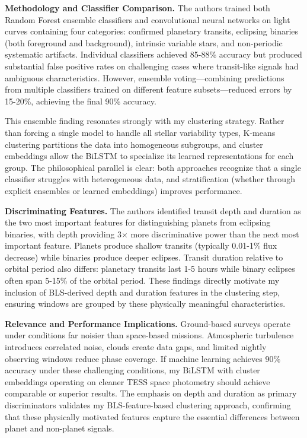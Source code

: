 \documentclass[letterpaper]{article} %
\begin{document}
\textbf{Methodology and Classifier Comparison.} The authors trained both Random Forest ensemble classifiers and convolutional neural networks on light curves containing four categories: confirmed planetary transits, eclipsing binaries (both foreground and background), intrinsic variable stars, and non-periodic systematic artifacts. Individual classifiers achieved 85-88\% accuracy but produced substantial false positive rates on challenging cases where transit-like signals had ambiguous characteristics. However, ensemble voting---combining predictions from multiple classifiers trained on different feature subsets---reduced errors by 15-20\%, achieving the final 90\% accuracy.

This ensemble finding resonates strongly with my clustering strategy. Rather than forcing a single model to handle all stellar variability types, K-means clustering partitions the data into homogeneous subgroups, and cluster embeddings allow the BiLSTM to specialize its learned representations for each group. The philosophical parallel is clear: both approaches recognize that a single classifier struggles with heterogeneous data, and stratification (whether through explicit ensembles or learned embeddings) improves performance.

\textbf{Discriminating Features.} The authors identified transit depth and duration as the two most important features for distinguishing planets from eclipsing binaries, with depth providing 3$\times$ more discriminative power than the next most important feature. Planets produce shallow transits (typically 0.01-1\% flux decrease) while binaries produce deeper eclipses. Transit duration relative to orbital period also differs: planetary transits last 1-5 hours while binary eclipses often span 5-15\% of the orbital period. These findings directly motivate my inclusion of BLS-derived depth and duration features in the clustering step, ensuring windows are grouped by these physically meaningful characteristics.

\textbf{Relevance and Performance Implications.} Ground-based surveys operate under conditions far noisier than space-based missions. Atmospheric turbulence introduces correlated noise, clouds create data gaps, and limited nightly observing windows reduce phase coverage. If machine learning achieves 90\% accuracy under these challenging conditions, my BiLSTM with cluster embeddings operating on cleaner TESS space photometry should achieve comparable or superior results. The emphasis on depth and duration as primary discriminators validates my BLS-feature-based clustering approach, confirming that these physically motivated features capture the essential differences between planet and non-planet signals.
\end{document}
